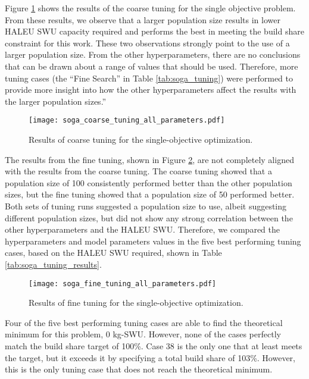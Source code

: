 Figure \ref{fig:soga_coarse_tuning} shows the results of the coarse tuning 
for the single objective problem. From these results, we observe that a 
larger population size results in lower \gls{HALEU} \gls{SWU} capacity required
and performs the best in meeting the build share constraint for this work. 
These two observations strongly point to the use of a larger population size. 
From the other hyperparameters, there are no conclusions that can be drawn 
about a range of values that should be used. 
Therefore, more tuning cases (the ``Fine Search'' in Table \ref{tab:soga_tuning})
were performed to provide more insight into how the other hyperparameters 
affect the results with the larger population sizes.''

\begin{figure}
    \texttt{[image: soga\_coarse\_tuning\_all\_parameters.pdf]}
    \caption{Results of coarse tuning for the single-objective 
    optimization.}
    \label{fig:soga_coarse_tuning}
\end{figure}

The results from the fine tuning, shown in Figure \ref{fig:soga_fine_tuning},
are not completely aligned with the results from the coarse tuning. 
The coarse tuning showed that a population size of 100 consistently performed 
better than the other population sizes, but the fine tuning showed that a 
population size of 50 performed better. Both sets of tuning runs suggested 
a population size to use, albeit suggesting different population sizes, 
but did not show any strong correlation between 
the other hyperparameters and the \gls{HALEU} \gls{SWU}. Therefore, 
we compared 
the hyperparameters and model parameters values in the five best performing 
tuning cases, based on the \gls{HALEU} \gls{SWU} required, shown in 
Table \ref{tab:soga_tuning_results}.

\begin{figure}
    \texttt{[image: soga\_fine\_tuning\_all\_parameters.pdf]}
    \caption{Results of fine tuning for the single-objective 
    optimization.}
    \label{fig:soga_fine_tuning}
\end{figure}

Four of the five best performing tuning cases are able to find the 
theoretical minimum for this problem, 0 kg-SWU. However, none of the 
cases perfectly match the build share target of 100\%. Case 38 is the only 
one that at least meets the target, but it exceeds it by specifying a total 
build share of 103\%. However, this is the only tuning case that does 
not reach the theoretical minimum. 

